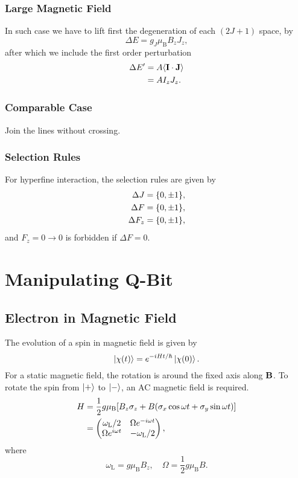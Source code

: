 \documentclass{article}
\begin{document}
\subsubsection{Large Magnetic Field}

In such case we have to lift first the degeneration of each $(2J+1)$ space, by
\[ \Delta E = g_J \mu_{\mathrm{B}} B_z J_z, \]
after which we include the first order perturbation
\begin{align*}
    \Delta E' &= A\langle \vb{I}\cdot \vb{J} \rangle \\ 
    &= A I_z J_z.
\end{align*}

\subsubsection{Comparable Case}

Join the lines without crossing.

\subsubsection{Selection Rules}

For hyperfine interaction, the selection rules are given by
\begin{align*}
    \Delta J &= \qty{0,\pm 1}, \\
    \Delta F &= \qty{0,\pm 1}, \\
    \Delta F_z &= \qty{0,\pm 1},
\end{align*}
and $F_z = 0\rightarrow 0$ is forbidden if $\Delta F = 0$.

\section{Manipulating Q-Bit}

\subsection{Electron in Magnetic Field}

The evolution of a spin in magnetic field is given by
\[ \ket{\chi(t)} = e^{-iHt/\hbar} \ket{\chi(0)}. \]
For a static magnetic field, the rotation is around the fixed axis along $\vb{B}$.
To rotate the spin from $\ket{+}$ to $\ket{-}$, an AC magnetic field is required.
\begin{align*}
    H &= \frac{1}{2}g\mu_{\mathrm{B}}\qty[ B_z \sigma_z + B(\sigma_x \cos\omega t + \sigma_y \sin\omega t) ] \\
    &= \begin{pmatrix}
        \omega_{\mathrm{L}}/2 & \Omega e^{-i\omega t} \\
        \Omega e^{i\omega t} & -\omega_{\mathrm{L}}/2
    \end{pmatrix},
\end{align*}
where
\[ \omega_{\mathrm{L}} = g \mu_{\mathrm{B}} B_z,\quad \Omega = \frac{1}{2} g \mu_{\mathrm{B}} B. \]
\end{document}
